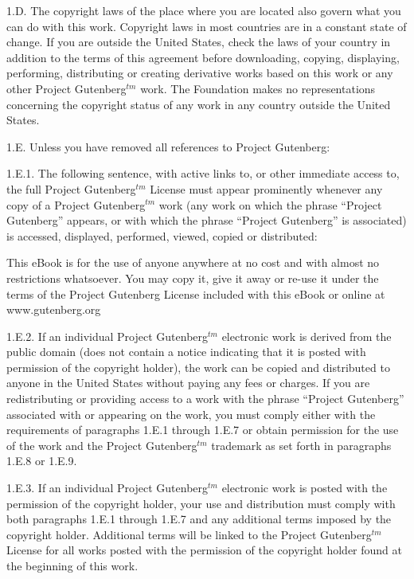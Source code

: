 1.D.  The copyright laws of the place where you are located also govern
what you can do with this work.  Copyright laws in most countries are in
a constant state of change.  If you are outside the United States, check
the laws of your country in addition to the terms of this agreement
before downloading, copying, displaying, performing, distributing or
creating derivative works based on this work or any other Project
Gutenberg$^{tm}$ work.  The Foundation makes no representations concerning
the copyright status of any work in any country outside the United
States.

1.E.  Unless you have removed all references to Project Gutenberg:

1.E.1.  The following sentence, with active links to, or other immediate
access to, the full Project Gutenberg$^{tm}$ License must appear prominently
whenever any copy of a Project Gutenberg$^{tm}$ work (any work on which the
phrase “Project Gutenberg” appears, or with which the phrase “Project
Gutenberg” is associated) is accessed, displayed, performed, viewed,
copied or distributed:

This eBook is for the use of anyone anywhere at no cost and with
almost no restrictions whatsoever.  You may copy it, give it away or
re-use it under the terms of the Project Gutenberg License included
with this eBook or online at www.gutenberg.org

1.E.2.  If an individual Project Gutenberg$^{tm}$ electronic work is derived
from the public domain (does not contain a notice indicating that it is
posted with permission of the copyright holder), the work can be copied
and distributed to anyone in the United States without paying any fees
or charges.  If you are redistributing or providing access to a work
with the phrase “Project Gutenberg” associated with or appearing on the
work, you must comply either with the requirements of paragraphs 1.E.1
through 1.E.7 or obtain permission for the use of the work and the
Project Gutenberg$^{tm}$ trademark as set forth in paragraphs 1.E.8 or
1.E.9.

1.E.3.  If an individual Project Gutenberg$^{tm}$ electronic work is posted
with the permission of the copyright holder, your use and distribution
must comply with both paragraphs 1.E.1 through 1.E.7 and any additional
terms imposed by the copyright holder.  Additional terms will be linked
to the Project Gutenberg$^{tm}$ License for all works posted with the
permission of the copyright holder found at the beginning of this work.

